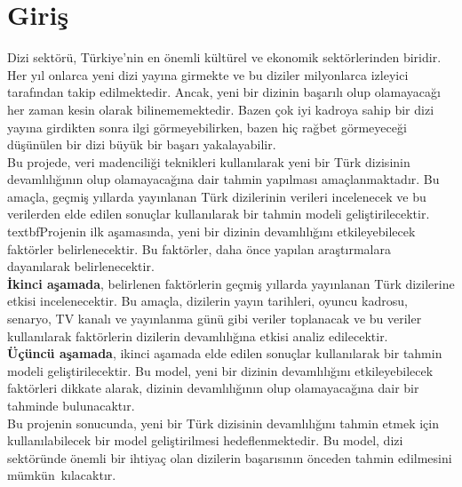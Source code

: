 \section{Giriş}

\indent Dizi sektörü, Türkiye'nin en önemli kültürel ve ekonomik sektörlerinden biridir. Her yıl onlarca yeni dizi yayına girmekte ve bu diziler milyonlarca izleyici tarafından takip edilmektedir. Ancak, yeni bir dizinin başarılı olup olamayacağı her zaman kesin olarak bilinememektedir. Bazen çok iyi kadroya sahip bir dizi yayına girdikten sonra ilgi görmeyebilirken, bazen hiç rağbet görmeyeceği düşünülen bir dizi büyük bir başarı yakalayabilir. \\
\indent Bu projede, veri madenciliği teknikleri kullanılarak yeni bir Türk dizisinin devamlılığının olup olamayacağına dair tahmin yapılması amaçlanmaktadır. Bu amaçla, geçmiş yıllarda yayınlanan Türk dizilerinin verileri incelenecek ve bu verilerden elde edilen sonuçlar kullanılarak bir tahmin modeli geliştirilecektir. \\
\indent textbf{Projenin ilk aşamasında}, yeni bir dizinin devamlılığını etkileyebilecek faktörler belirlenecektir. Bu faktörler, daha önce yapılan araştırmalara dayanılarak belirlenecektir. \\
\textbf{İkinci aşamada}, belirlenen faktörlerin geçmiş yıllarda yayınlanan Türk dizilerine etkisi incelenecektir. Bu amaçla, dizilerin yayın tarihleri, oyuncu kadrosu, senaryo, TV kanalı ve yayınlanma günü gibi veriler toplanacak ve bu veriler kullanılarak faktörlerin dizilerin devamlılığına etkisi analiz edilecektir.\\ 
\textbf{Üçüncü aşamada}, ikinci aşamada elde edilen sonuçlar kullanılarak bir tahmin modeli geliştirilecektir. Bu model, yeni bir dizinin devamlılığını etkileyebilecek faktörleri dikkate alarak, dizinin devamlılığının olup olamayacağına dair bir tahminde bulunacaktır. \\
Bu projenin sonucunda, yeni bir Türk dizisinin devamlılığını tahmin etmek için kullanılabilecek bir model geliştirilmesi hedeflenmektedir. Bu model, dizi sektöründe önemli bir ihtiyaç olan dizilerin başarısının önceden tahmin edilmesini mümkün kılacaktır.